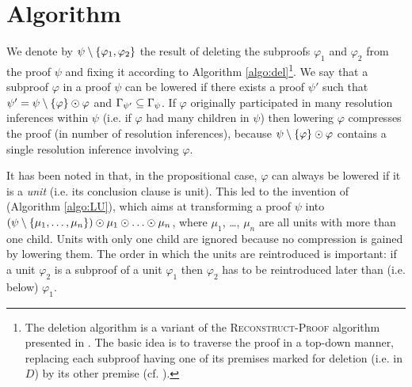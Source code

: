 
\section{Algorithm \LowerUnits}
\label{sec:PropositionalLU}

We denote by $\psi \setminus \{\varphi_1, \varphi_2\}$ the result of deleting the subproofs $\varphi_1$ and $\varphi_2$ from the proof $\psi$ and fixing it according to Algorithm \ref{algo:del}\footnote{
The deletion algorithm is a variant of the \textsc{Reconstruct-Proof} algorithm presented in \cite{RP11}.
The basic idea is to traverse the proof in a top-down manner, replacing each subproof having one of its premises marked for deletion (i.e. in $D$) by its other premise (cf. \cite{Boudou}).
}. 
We say that a subproof $\varphi$ in a proof $\psi$ can be lowered 
if there exists a proof
$\psi'$ such that $\psi' = \psi \setminus \{\varphi\} \odot \varphi$ and
$\Gamma_{\psi'} \subseteq \Gamma_{\psi}$. If $\varphi$ originally participated in many resolution inferences within $\psi$ (i.e. if $\varphi$ had many children in $\psi$) then lowering $\varphi$ compresses the proof (in number of resolution inferences), because $\psi \setminus \{\varphi\} \odot \varphi$ contains a single resolution inference involving $\varphi$.

%
It has been noted in \cite{LURPI} that, in the propositional case, $\varphi$ can always be lowered if it is a \emph{unit} (i.e. its conclusion clause is unit). This led to the invention of {\LowerUnits} (Algorithm \ref{algo:LU}), which aims at transforming a proof $\psi$ into $(\psi \setminus \{\mu_1,\ldots,\mu_n\}) \odot \mu_1 \odot \ldots \odot \mu_n$, where $\mu_1$, \ldots, $\mu_n$ are all units with more than one child. Units with only one child are ignored because no compression is gained by lowering them. The order in which the units are reintroduced is important:
if a unit $\varphi_2$ is a subproof of a unit
$\varphi_1$ then $\varphi_2$ has to be reintroduced later than (i.e. below) $\varphi_1$.


\newlength\algowd
\def\savewd#1{\setbox0=\hbox{#1\hspace{.7in}}\algowd=\wd0\relax#1}
\newcommand\algolines[2]{\savewd{#1}%
  \tcp*{\parbox[t]{\dimexpr\algowidth-\algowd}{#2}}}



